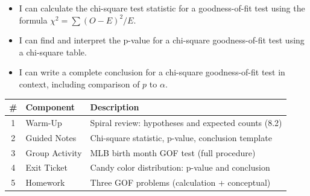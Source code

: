 \documentclass[10pt]{article}
\begin{document}

\vspace{2.4cm}
\namedateperiod

\begin{learningtargetbox}
\begin{itemize}
    \item I can calculate the chi-square test statistic for a goodness-of-fit test
          using the formula $\chi^2 = \sum (O - E)^2 / E$.
    \item I can find and interpret the p-value for a chi-square goodness-of-fit test
          using a chi-square table.
    \item I can write a complete conclusion for a chi-square goodness-of-fit test
          in context, including comparison of $p$ to $\alpha$.
\end{itemize}
\end{learningtargetbox}

\begin{tocbox}
\renewcommand{\arraystretch}{1.5}
\begin{tabularx}{\linewidth}{@{} c l X @{}}
    \textbf{\#} & \textbf{Component} & \textbf{Description} \\
    \hline
    1 & Warm-Up        & Spiral review: hypotheses and expected counts (8.2) \\
    2 & Guided Notes   & Chi-square statistic, p-value, conclusion template \\
    3 & Group Activity & MLB birth month GOF test (full procedure) \\
    4 & Exit Ticket    & Candy color distribution: p-value and conclusion \\
    5 & Homework       & Three GOF problems (calculation + conceptual) \\
\end{tabularx}
\end{tocbox}
\end{document}
